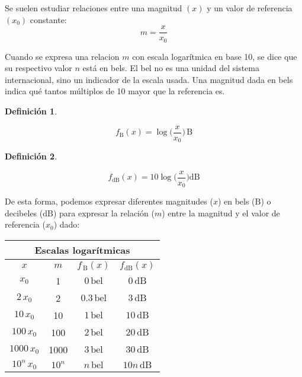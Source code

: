 \documentclass[a5paper,12pt,twoside]{book}
\newtheorem{defn}{{Definición}}[chapter]
\begin{document}
Se suelen estudiar relaciones entre una magnitud $(x)$ y un valor de referencia $(x_0)$ constante:
\begin{equation*}
    m=\frac{x}{x_0}
\end{equation*}

Cuando se expresa una relacion $m$ con escala logarítmica en base 10, se dice que su respectivo valor $n$ está en bels. El bel no es una unidad del sistema internacional, sino un indicador de la escala usada. Una magnitud dada en bels indica qué tantos múltiplos de 10 mayor que la referencia es.

\begin{mdframed}[style=MyFrame1]
    \begin{defn}
    \end{defn}
    \begin{equation*}
        f_{\si{\bel}}(x)=\log \Big( \frac{x}{x_0} \Big) \, \si{\bel}
    \end{equation*}
\end{mdframed}

\begin{mdframed}[style=MyFrame1]
    \begin{defn}
    \end{defn}
    \begin{equation*}
        f_{\si{\deci\bel}}(x) = 10 \log \Big( \frac{x}{x_0} \Big) \si{\deci\bel}
    \end{equation*}
\end{mdframed}

De esta forma, podemos expresar diferentes magnitudes ($x$) en bels ($\si{\bel}$) o decibeles ($\si{\deci\bel}$) para expresar la relación ($m$) entre la magnitud y el valor de referencia ($x_0$) dado:

\begin{center}
    \begin{tabular}{|c|c|c|c|}
        \hline 
        \multicolumn{4}{|c|}{Escalas logarítmicas} \\ \hline \hline
        $x$ & $m$ & $f_{\, \si{\bel}}(x)$ & $f_{\si{\deci\bel}}(x)$ \\
        \hline \hline
        $x_0$ & 1 & $0 \, \mathrm{bel}$ & $0 \, \si{\deci\bel}$ \\ \hline
        $2 \, x_0$ & 2 & $0.3 \, \mathrm{bel}$ & $3 \, \si{\deci\bel}$ \\ \hline
        $10 \, x_0$ & 10 & $1 \, \mathrm{bel}$ & $10 \, \si{\deci\bel}$ \\ \hline
        $100 \, x_0$ & 100 & $2 \, \mathrm{bel}$ & $20 \, \si{\deci\bel}$ \\ \hline
        $1000 \, x_0$ & 1000 & $3 \, \mathrm{bel}$ & $30 \, \si{\deci\bel}$ \\ \hline
        $10^n \, x_0$ & $10^n$ & $n \, \mathrm{bel}$ & $10 n \, \si{\deci\bel}$ \\ \hline
    \end{tabular}
\end{center}
\end{document}
